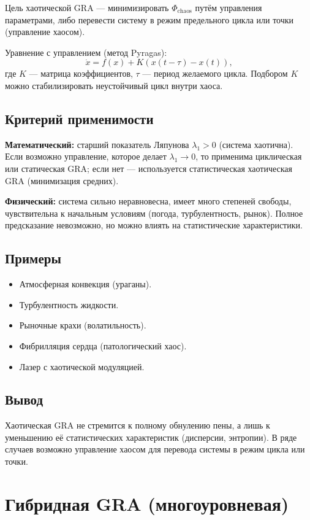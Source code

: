 \documentclass[12pt,a4paper]{article}
\begin{document}
Цель хаотической GRA — минимизировать $\Phi_{\text{chaos}}$ путём управления параметрами, либо перевести систему в режим предельного цикла или точки (управление хаосом).

Уравнение с управлением (метод Pyragas):
\begin{equation}
    \dot{x} = f(x) + K(x(t-\tau) - x(t)),
\end{equation}
где $K$ — матрица коэффициентов, $\tau$ — период желаемого цикла. Подбором $K$ можно стабилизировать неустойчивый цикл внутри хаоса.

\subsection{Критерий применимости}

\textbf{Математический:} старший показатель Ляпунова $\lambda_1 > 0$ (система хаотична). Если возможно управление, которое делает $\lambda_1 \to 0$, то применима циклическая или статическая GRA; если нет — используется статистическая хаотическая GRA (минимизация средних).

\textbf{Физический:} система сильно неравновесна, имеет много степеней свободы, чувствительна к начальным условиям (погода, турбулентность, рынок). Полное предсказание невозможно, но можно влиять на статистические характеристики.

\subsection{Примеры}
\begin{itemize}
    \item Атмосферная конвекция (ураганы).
    \item Турбулентность жидкости.
    \item Рыночные крахи (волатильность).
    \item Фибрилляция сердца (патологический хаос).
    \item Лазер с хаотической модуляцией.
\end{itemize}

\subsection{Вывод}
Хаотическая GRA не стремится к полному обнулению пены, а лишь к уменьшению её статистических характеристик (дисперсии, энтропии). В ряде случаев возможно управление хаосом для перевода системы в режим цикла или точки.

\section{Гибридная GRA (многоуровневая)}
\label{sec:hybrid}
\end{document}
